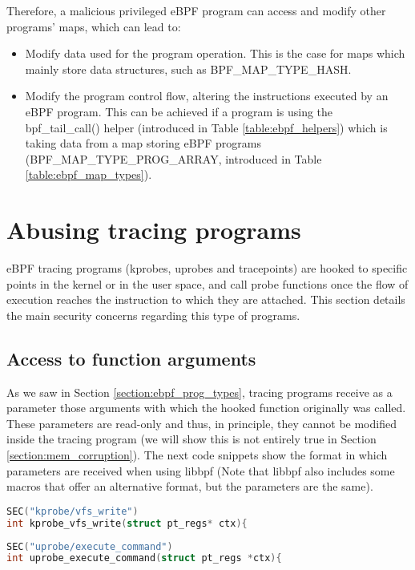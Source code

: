 Therefore, a malicious privileged eBPF program can access and modify other programs' maps, which can lead to:
\begin{itemize}
\item Modify data used for the program operation. This is the case for maps which mainly store data structures, such as BPF\_MAP\_TYPE\_HASH.
\item Modify the program control flow, altering the instructions executed by an eBPF program. This can be achieved if a program is using the bpf\_tail\_call() helper (introduced in Table \ref{table:ebpf_helpers}) which is taking data from a map storing eBPF programs (BPF\_MAP\_TYPE\_PROG\_ARRAY, introduced in Table \ref{table:ebpf_map_types}).
\end{itemize}


\section{Abusing tracing programs}
eBPF tracing programs (kprobes, uprobes and tracepoints) are hooked to specific points in the kernel or in the user space, and call probe functions once the flow of execution reaches the instruction to which they are attached. This section details the main security concerns regarding this type of programs.

\subsection{Access to function arguments} \label{subsection:tracing_arguments}
As we saw in Section \ref{section:ebpf_prog_types}, tracing programs receive as a parameter those arguments with which the hooked function originally was called. These parameters are read-only and thus, in principle, they cannot be modified inside the tracing program (we will show this is not entirely true in Section \ref{section:mem_corruption}). The next code snippets show the format in which parameters are received when using libbpf (Note that libbpf also includes some macros that offer an alternative format, but the parameters are the same).

\begin{lstlisting}[language=C, caption={Probe function for a kprobe on the kernel function vfs\_write.}, label={code:format_kprobe}]
SEC("kprobe/vfs_write")
int kprobe_vfs_write(struct pt_regs* ctx){
\end{lstlisting}

\begin{lstlisting}[language=C, caption={Probe function for an uprobe, execute\_command is defined from user space.}, label={code:format_uprobe}]
SEC("uprobe/execute_command")
int uprobe_execute_command(struct pt_regs *ctx){
\end{lstlisting}

